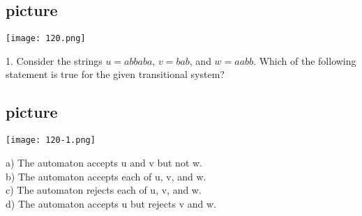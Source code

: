 \documentclass[a4,9pt]{beamer}
\begin{document}
\begin{frame}
\begin{center}
\section{picture}
\texttt{[image: 120.png]}
\end{center}

1. Consider the strings $u = abbaba$, $v = bab$, and $w = aabb$. Which of the following statement is true
for the given transitional system?\\
\begin{center}
\section{picture}
\texttt{[image: 120-1.png]}
\end{center}

\vspace*{0.1cm}
\pause
\pause
a) The automaton accepts u and v but not w.\\
b) The automaton accepts each of u, v, and w.\\
c) The automaton rejects each of u, v, and w.\\
d) The automaton accepts u but rejects v and w.\\
\end{frame}
\end{document}
